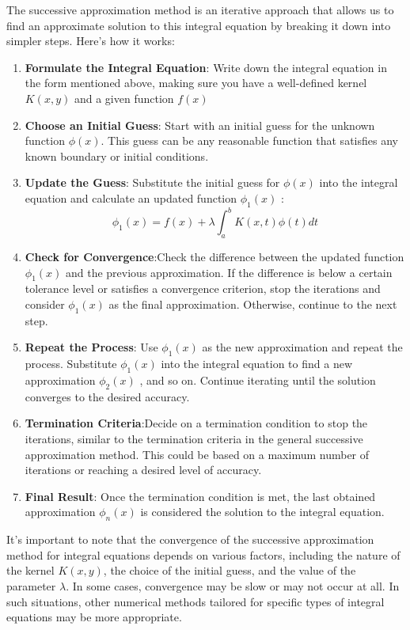 \documentclass[]{article}
\begin{document}
The successive approximation method is an iterative approach that allows us to find an approximate solution to this integral equation by breaking it down into simpler steps. Here's how it works:

\begin{enumerate}[itemsep=10pt]
    \item \textbf{Formulate the Integral Equation}: Write down the integral equation in the form mentioned above, making sure you have a well-defined kernel $K(x,y)$ and a given function $f(x)$ 
    \item \textbf{Choose an Initial Guess}: Start with an initial guess for the unknown function $\phi(x)$. This guess can be any reasonable function that satisfies any known boundary or initial conditions.
    \item \textbf{Update the Guess}: Substitute the initial guess for $\phi(x)$ into the integral equation and calculate an updated function $\phi_1(x)$ :
    \[
       \phi_1(x) = f(x) + \lambda\int_{a}^{b} K(x,t) \phi(t)dt     
    \]
    \item \textbf{Check for Convergence}:Check the difference between the updated function $\phi_1(x)$ and the previous approximation. If the difference is below a certain tolerance level or satisfies a convergence criterion, stop the iterations and consider $\phi_1(x)$ as the final approximation. Otherwise, continue to the next step.
    \item \textbf{Repeat the Process}: Use $\phi_1(x)$ as the new approximation and repeat the process. Substitute $\phi_1(x)$ into the integral equation to find a new approximation $\phi_2(x)$ , and so on. Continue iterating until the solution converges to the desired accuracy.
    \item \textbf{Termination Criteria}:Decide on a termination condition to stop the iterations, similar to the termination criteria in the general successive approximation method. This could be based on a maximum number of iterations or reaching a desired level of accuracy.    
    \item \textbf{Final Result}: Once the termination condition is met, the last obtained approximation $\phi_n(x)$ is considered the solution to the integral equation.
\end{enumerate}
It's important to note that the convergence of the successive approximation method for integral equations depends on various factors, including the nature of the kernel $K(x,y)$, the choice of the initial guess, and the value of the parameter 
$\lambda$. In some cases, convergence may be slow or may not occur at all. In such situations, other numerical methods tailored for specific types of integral equations may be more appropriate.
\end{document}
